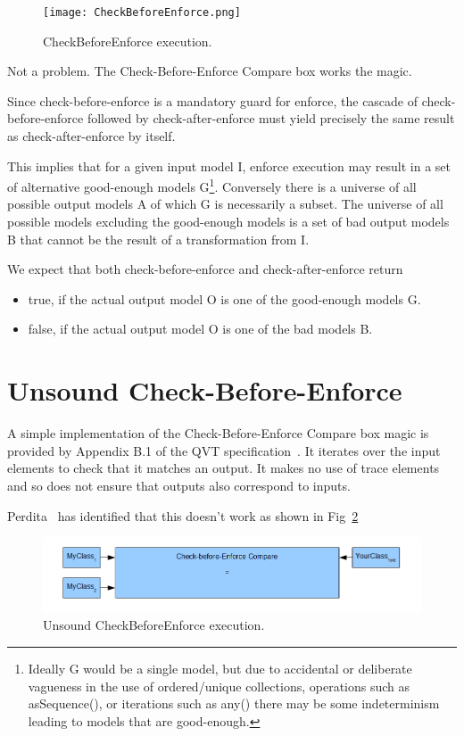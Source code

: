 \documentclass{llncs}
\begin{document}
\begin{figure}[h]
	\centering
	\texttt{[image: CheckBeforeEnforce.png]}
	\caption{CheckBeforeEnforce execution.}
	\label{fig:CheckBeforeEnforce}
\end{figure}

Not a problem. The Check-Before-Enforce Compare box works the magic.

Since check-before-enforce is a mandatory guard for enforce, the cascade of check-before-enforce followed by check-after-enforce must yield precisely the same result as check-after-enforce by itself.

This implies that for a given input model I, enforce execution may result in a set of alternative good-enough models G\footnote{Ideally G would be a single model, but due to accidental or deliberate vagueness in the use of ordered/unique collections, operations such as asSequence(), or iterations such as any() there may be some indeterminism leading to models that are good-enough.}. Conversely there is a universe of all possible output models A of which G is necessarily a subset. The universe of all possible models excluding the good-enough models is a set of bad output models B that cannot be the result of a transformation from I.

We expect that both check-before-enforce and check-after-enforce return
\begin{itemize}
	\item true, if the actual output model O is one of the good-enough models G.
	\item false, if the actual output model O is one of the bad models B.
\end{itemize}

\section{Unsound Check-Before-Enforce}

A simple implementation of the Check-Before-Enforce Compare box magic is provided by Appendix B.1 of the QVT specification~\cite{QVT-1.3}. It iterates over the input elements to check that it matches an output. It makes no use of trace elements and so does not ensure that outputs also correspond to inputs.

Perdita~\cite{Stevens-game} has identified that this doesn't work as shown in Fig~\ref{fig:UnsoundCheckBeforeEnforce}

\begin{figure}[h]
	\centering
	\includegraphics[width=1.0\textwidth]{UnsoundCheckBeforeEnforce.png}
	\caption{Unsound CheckBeforeEnforce execution.}
	\label{fig:UnsoundCheckBeforeEnforce}
\end{figure}
\end{document}
